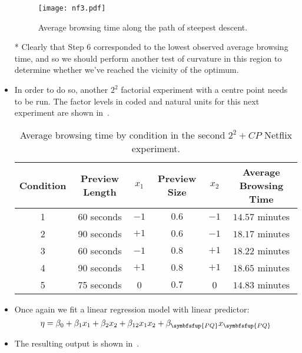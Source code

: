 \begin{itemize}
\begin{figure}[!htbp]
                  \centering
                  \texttt{[image: nf3.pdf]}
                  \caption{Average browsing time along the path of steepest descent.}\label{fig:nf3}
            \end{figure}
      \item[*] Clearly that Step 6 corresponded to the lowest observed average browsing time, and so we should
            perform another test of curvature in this region to determine whether we’ve reached the vicinity of the
            optimum.
      \item In order to do so, another $2^2$ factorial experiment with a centre point needs to be run. The factor
            levels in coded and natural units for this next experiment are shown in~.
            \begin{table}[!htbp]
                  \centering
                  \caption{Average browsing time by condition in the second $2^2 + CP$ Netflix experiment.}\label{tab:netflixtab3}
                  \begin{tabular}{cccccc}
                        \toprule Condition & Preview Length & $x_{1}$ & Preview Size & $x_{2}$ & Average Browsing Time \\
                        \midrule 1         & 60 seconds     & $-1$    & $0.6$        & $-1$    & $14.57$ minutes       \\
                        2                  & 90 seconds     & $+1$    & $0.6$        & $-1$    & $18.17$ minutes       \\
                        3                  & 60 seconds     & $-1$    & $0.8$        & $+1$    & $18.22$ minutes       \\
                        4                  & 90 seconds     & $+1$    & $0.8$        & $+1$    & $18.65$ minutes       \\
                        5                  & 75 seconds     & 0       & $0.7$        & 0       & $14.83$ minutes       \\
                        \bottomrule
                  \end{tabular}
            \end{table}
      \item Once again we fit a linear regression model with linear predictor:
            \[ \eta=\beta_0+\beta_1x_1+\beta_2x_2+\beta_{12}x_1x_2+\beta_{\symbfsfup{PQ}}x_{\symbfsfup{PQ}} \]
      \item The resulting output is shown in~.

\end{itemize}
